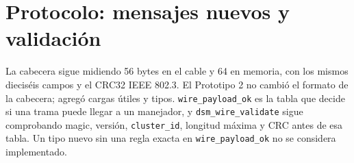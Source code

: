 \documentclass[11pt,spanish]{article}
\begin{document}
\section{Protocolo: mensajes nuevos y validación}\label{sec:protocolo}

La cabecera sigue midiendo 56 bytes en el cable y 64 en memoria, con los mismos dieciséis campos y el CRC32 IEEE 802.3. El Prototipo 2 no cambió el formato de la cabecera; agregó cargas útiles y tipos. \texttt{wire\_payload\_ok} es la tabla que decide si una trama puede llegar a un manejador, y \texttt{dsm\_wire\_validate} sigue comprobando magic, versión, \texttt{cluster\_id}, longitud máxima y CRC antes de esa tabla. Un tipo nuevo sin una regla exacta en \texttt{wire\_payload\_ok} no se considera implementado.
\end{document}

